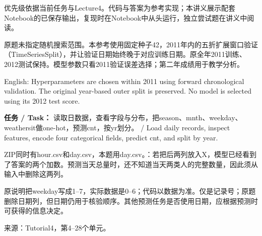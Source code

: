 优先级依据当前任务与Lecture4。代码与答案为参考实现；本讲义展示配套Notebook的已保存输出，复现时在Notebook中从头运行，独立尝试题在讲义中阅读。







原题未指定随机搜索范围。本参考使用固定种子42，2011年内的五折扩展窗口验证（TimeSeriesSplit），并让验证日期始终晚于对应训练日期。原全年2011训练、2012测试保持。模型参数只看2011验证误差选择；第二年成绩用于教学分析。


English: Hyperparameters are chosen within 2011 using forward chronological validation. The original year-based outer split is preserved. No model is selected using its 2012 test score.

















\textbf{任务 / Task：} 读取日数据，查看字段与分布，把season、mnth、weekday、weathersit做one-hot，预测cnt，按yr划分。 / Load daily records, inspect features, encode four categorical fields, predict cnt, and split by year.


ZIP同时有hour.csv和day.csv，本题用day.csv。：若把后两列放入X，模型已经看到了答案的两个加数。预测当天总量时，还不知道当天两类人的完整数量，因此须从输入中删除这两列。


原说明把weekday写成1–7，实际数据是0–6；代码以数据为准。仅是记录号；原题删除日期列，但日期仍用于核验顺序。其他预测任务是否使用日期，应根据预测时可获得的信息决定。


来源：Tutorial4，第4–28个单元。





